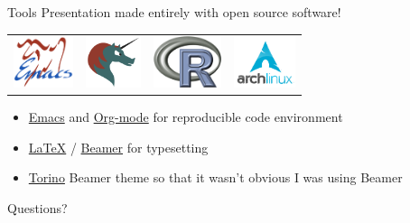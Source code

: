 \documentclass[sans,aspectratio=169,presentation,bigger,fleqn]{beamer}
\begin{document}
\begin{frame}[label=sec-36]{Tools}
Presentation made entirely with open source software!

\begin{center}
\begin{center}
\begin{tabular}{llll}
\includegraphics[height=1.5cm]{./img/emacs.png} & \includegraphics[height=1.5cm]{./img/org-mode.png} & \includegraphics[height=1.5cm]{./img/r.png} & \includegraphics[height=1.5cm]{./img/arch.png}\\
\end{tabular}
\end{center}
\end{center}

\begin{itemize}
\item \href{http://www.gnu.org/software/emacs/}{Emacs} and \href{http://orgmode.org/}{Org-mode} for reproducible code environment
\item \href{http://www.latex-project.org/}{\LaTeX} / \href{http://www.ctan.org/tex-archive/macros/latex/contrib/beamer/}{Beamer} for typesetting
\item \href{http://blog.barisione.org/2007-09/torino-a-pretty-theme-for-latex-beamer/}{Torino} Beamer theme so that it wasn't obvious I was using Beamer
\end{itemize}
\end{frame}

\begin{frame}[label=sec-37]{}
\LARGE
\begin{center}
Questions?
\end{center}
\end{frame}
\end{document}
